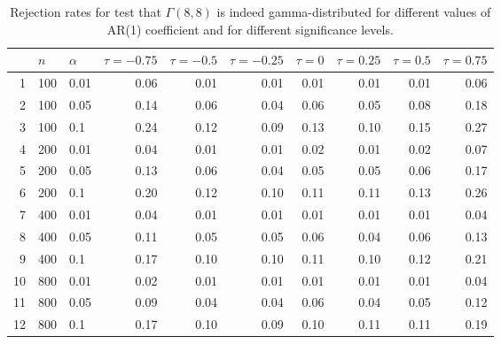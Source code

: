 \begin{table}[ht]
\centering
\caption{Rejection rates for test that $\Gamma(8, 8)$ is 
                   indeed
                   gamma-distributed for
                   different values of AR(1) coefficient and for different 
                   significance levels.} 
\label{table:rr_gamma}
\begin{tabular}{rllrrrrrrr}
  \hline
 & $n$ & $\alpha$ & $\tau = -0.75$ & $\tau = -0.5$ & $\tau = -0.25$ & $\tau = 0$ & $\tau = 0.25$ & $\tau = 0.5$ & $\tau = 0.75$ \\ 
  \hline
1 & 100 & 0.01 & 0.06 & 0.01 & 0.01 & 0.01 & 0.01 & 0.01 & 0.06 \\ 
  2 & 100 & 0.05 & 0.14 & 0.06 & 0.04 & 0.06 & 0.05 & 0.08 & 0.18 \\ 
  3 & 100 & 0.1 & 0.24 & 0.12 & 0.09 & 0.13 & 0.10 & 0.15 & 0.27 \\ 
  4 & 200 & 0.01 & 0.04 & 0.01 & 0.01 & 0.02 & 0.01 & 0.02 & 0.07 \\ 
  5 & 200 & 0.05 & 0.13 & 0.06 & 0.04 & 0.05 & 0.05 & 0.06 & 0.17 \\ 
  6 & 200 & 0.1 & 0.20 & 0.12 & 0.10 & 0.11 & 0.11 & 0.13 & 0.26 \\ 
  7 & 400 & 0.01 & 0.04 & 0.01 & 0.01 & 0.01 & 0.01 & 0.01 & 0.04 \\ 
  8 & 400 & 0.05 & 0.11 & 0.05 & 0.05 & 0.06 & 0.04 & 0.06 & 0.13 \\ 
  9 & 400 & 0.1 & 0.17 & 0.10 & 0.10 & 0.11 & 0.10 & 0.12 & 0.21 \\ 
  10 & 800 & 0.01 & 0.02 & 0.01 & 0.01 & 0.01 & 0.01 & 0.01 & 0.04 \\ 
  11 & 800 & 0.05 & 0.09 & 0.04 & 0.04 & 0.06 & 0.04 & 0.05 & 0.12 \\ 
  12 & 800 & 0.1 & 0.17 & 0.10 & 0.09 & 0.10 & 0.11 & 0.11 & 0.19 \\ 
   \hline
\end{tabular}
\end{table}

